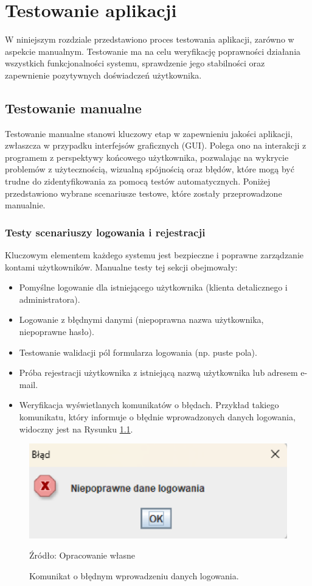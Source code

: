 
\chapter{Testowanie aplikacji}

W niniejszym rozdziale przedstawiono proces testowania aplikacji, zarówno w aspekcie manualnym. Testowanie ma na celu weryfikację poprawności działania wszystkich funkcjonalności systemu, sprawdzenie jego stabilności oraz zapewnienie pozytywnych doświadczeń użytkownika.

\section{Testowanie manualne}
Testowanie manualne stanowi kluczowy etap w zapewnieniu jakości aplikacji, zwłaszcza w przypadku interfejsów graficznych (GUI). Polega ono na interakcji z programem z perspektywy końcowego użytkownika, pozwalając na wykrycie problemów z użytecznością, wizualną spójnością oraz błędów, które mogą być trudne do zidentyfikowania za pomocą testów automatycznych. Poniżej przedstawiono wybrane scenariusze testowe, które zostały przeprowadzone manualnie.
\clearpage

\begin{minipage}{\linewidth}
\subsection{Testy scenariuszy logowania i rejestracji}
Kluczowym elementem każdego systemu jest bezpieczne i poprawne zarządzanie kontami użytkowników. Manualne testy tej sekcji obejmowały:
\begin{itemize}
    \item Pomyślne logowanie dla istniejącego użytkownika (klienta detalicznego i administratora).
    \item Logowanie z błędnymi danymi (niepoprawna nazwa użytkownika, niepoprawne hasło).
    \item Testowanie walidacji pól formularza logowania (np. puste pola).
    \item Próba rejestracji użytkownika z istniejącą nazwą użytkownika lub adresem e-mail.
    \item Weryfikacja wyświetlanych komunikatów o błędach. Przykład takiego komunikatu, który informuje o błędnie wprowadzonych danych logowania, widoczny jest na Rysunku \ref{fig:bledne_logowanie}.
\end{itemize}

\begin{figure}[H]
    \centering
    \includegraphics[width=0.5\linewidth]{figures/fig_0004.eps}
    \caption{Komunikat o błędnym wprowadzeniu danych logowania. }
    \label{fig:bledne_logowanie}
    \small{Źródło: Opracowanie własne}
\end{figure}
\end{minipage}

